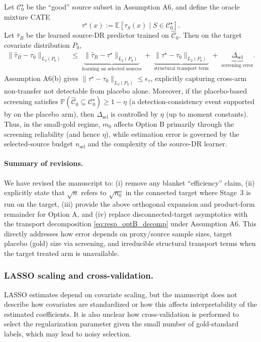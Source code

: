 {Let $\mathcal{C}_0^\star$ be the ``good'' source subset in Assumption A6, and define the oracle mixture CATE
\[
\tau^\star(x):=\mathbb{E}\!\left[\tau_S(x)\mid S\in\mathcal{C}_0^\star\right].
\]
Let $\widehat\tau_B$ be the learned source-DR predictor trained on $\widehat{\mathcal{C}}_0$. Then on the target covariate distribution $P_0$,
\begin{align}
\|\widehat\tau_B-\tau_0\|_{L_2(P_0)}
\;&\le\;
\underbrace{\|\widehat\tau_B-\tau^\star\|_{L_2(P_0)}}_{\text{learning on selected sources}}
\;+\;
\underbrace{\|\tau^\star-\tau_0\|_{L_2(P_0)}}_{\text{structural transport term}}
\;+\;
\underbrace{\Delta_{\mathrm{sel}}}_{\text{screening error}}.
\label{eq:resp_optB_decomp}
\end{align}
Assumption A6(b) gives $\|\tau^\star-\tau_0\|_{L_2(P_0)}\le \epsilon_\tau$, explicitly capturing cross-arm non-transfer not detectable from placebo alone. Moreover, if the placebo-based screening satisfies $\mathbb{P}(\widehat{\mathcal{C}}_0\subseteq\mathcal{C}_0^\star)\ge 1-\eta$ (a detection-consistency event supported by \cite{tian2023transfer} on the placebo arm), then $\Delta_{\mathrm{sel}}$ is controlled by $\eta$ (up to moment constants). Thus, in the small-gold regime, $m_0$ affects Option B primarily through the screening reliability (and hence $\eta$), while estimation error is governed by the selected-source budget $n_{\mathrm{sel}}$ and the complexity of the source-DR learner.

\paragraph{Summary of revisions.}
We have revised the manuscript to: (i) remove any blanket ``efficiency'' claim, (ii) explicitly state that $\sqrt{n}$ refers to $\sqrt{n_0}$ in the connected target where Stage~3 is run on the target, (iii) provide the above orthogonal expansion and product-form remainder for Option A, and (iv) replace disconnected-target asymptotics with the transport decomposition \eqref{eq:resp_optB_decomp} under Assumption A6. This directly addresses how error depends on proxy/source sample sizes, target placebo (gold) size via screening, and irreducible structural transport terms when the target treated arm is unavailable.
}





\subsubsection{LASSO scaling and cross-validation.}  
LASSO estimates depend on covariate scaling, but the manuscript does not describe how covariates are standardized or how this affects interpretability of the estimated coefficients. It is also unclear how cross-validation is performed to select the regularization parameter given the small number of gold-standard labels, which may lead to noisy selection.

